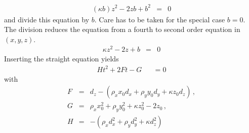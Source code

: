 \documentclass[12pt,a4paper,twoside,openright,BCOR10mm,headsepline,titlepage,abstracton,chapterprefix,final]{scrreprt}
\begin{document}
\begin{eqnarray}
 (\kappa b) z^2 - 2 z b + b^2 &=& 0 
\end{eqnarray}
and divide this equation by $b$. Care has to be taken for the special case $b=0$. The division reduces the equation from a fourth to second order equation in $(x,y,z)$.
\begin{eqnarray}
 \kappa z^2 - 2 z + b &=& 0
\end{eqnarray}
Inserting the straight equation yields
\begin{eqnarray}
 H t^2 + 2 F t - G &&
 = 0
\end{eqnarray}
with
\begin{subequations}
\begin{eqnarray}
   F &=& d_z - \left(  \rho_x x_0 d_x + \rho_y y_0 d_y + \kappa z_0 d_z  \right)\,, \\
   G &=& \rho_x x_0^2 + \rho_y y_0^2 + \kappa z_0^2 - 2 z_0 \,, \\
   H &=& - \left(   \rho_x d_x^2 + \rho_y d_y^2 + \kappa d_z^2   \right)
\end{eqnarray}
\end{subequations}
\end{document}
